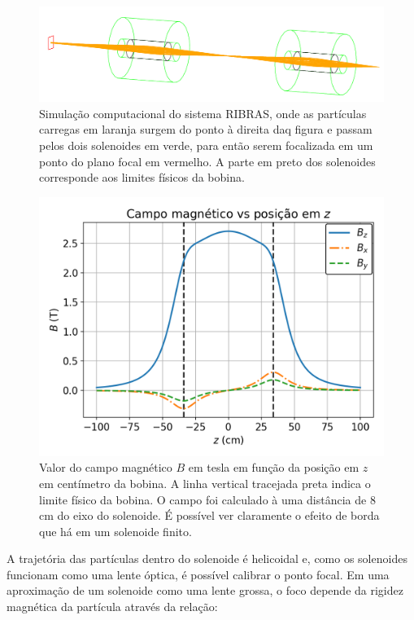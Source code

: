 \documentclass[a4paper,12pt,oneside]{book}
\begin{document}
\begin{figure}[H]
    \centering
    \includegraphics[scale = 0.95]{figs/Foco2S.png}
    \caption{Simulação computacional do sistema RIBRAS, onde as partículas carregas em laranja surgem do ponto à direita daq figura e passam pelos dois solenoides em verde, para então serem focalizada em um ponto do plano focal em vermelho. A parte em preto dos solenoides corresponde aos limites físicos da bobina\cite{ribras_leo}.}
    \label{fig:sim_ribras}
\end{figure}

\begin{figure}[H]
    \centering
    \includegraphics[scale = 0.85]{figs/Campo_mag.png}
    \caption{Valor do campo magnético $B$ em tesla em função da posição em $z$ em centímetro da bobina. A linha vertical tracejada preta indica o limite físico da bobina. O campo foi calculado à uma distância de 8 cm do eixo do solenoide. É possível ver claramente o efeito de borda que há em um solenoide finito\cite{magnetic_field}.}
    \label{fig:campo_mag}
\end{figure}

\par A trajetória das partículas dentro do solenoide é helicoidal e, como os solenoides funcionam como uma lente óptica, é possível calibrar o ponto focal. Em uma aproximação de um solenoide como uma lente grossa, o foco depende da rigidez magnética da partícula através da relação\cite{KOLATA1989503, zamora_mater}:
\end{document}
